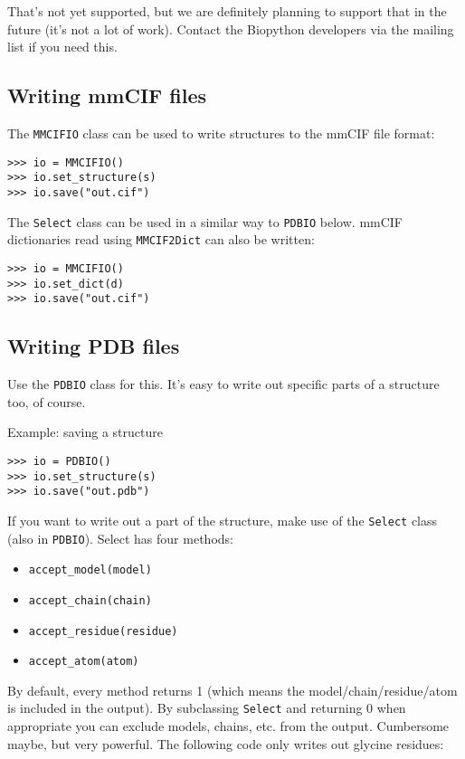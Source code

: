 That's not yet supported, but we are definitely planning to support that
in the future (it's not a lot of work). Contact the Biopython developers
via the mailing list if you need this.

\subsection{Writing mmCIF files}

The \texttt{MMCIFIO} class can be used to write structures to the mmCIF file format:

\begin{verbatim}
>>> io = MMCIFIO()
>>> io.set_structure(s)
>>> io.save("out.cif")
\end{verbatim}
The \texttt{Select} class can be used in a similar way to \texttt{PDBIO} below.
mmCIF dictionaries read using \texttt{MMCIF2Dict} can also be written:

\begin{verbatim}
>>> io = MMCIFIO()
>>> io.set_dict(d)
>>> io.save("out.cif")
\end{verbatim}

\subsection{Writing PDB files}

Use the \texttt{PDBIO} class for this. It's easy to write out specific parts
of a structure too, of course.

Example: saving a structure

\begin{verbatim}
>>> io = PDBIO()
>>> io.set_structure(s)
>>> io.save("out.pdb")
\end{verbatim}
If you want to write out a part of the structure, make use of the
\texttt{Select} class (also in \texttt{PDBIO}). Select has four methods:

\begin{itemize}
\item \verb+accept_model(model)+
\item \verb+accept_chain(chain)+
\item \verb+accept_residue(residue)+
\item \verb+accept_atom(atom)+
\end{itemize}
By default, every method returns 1 (which means the model/\-chain/\-residue/\-atom
is included in the output). By subclassing \texttt{Select} and returning
0 when appropriate you can exclude models, chains, etc. from the output.
Cumbersome maybe, but very powerful. The following code only writes
out glycine residues:

